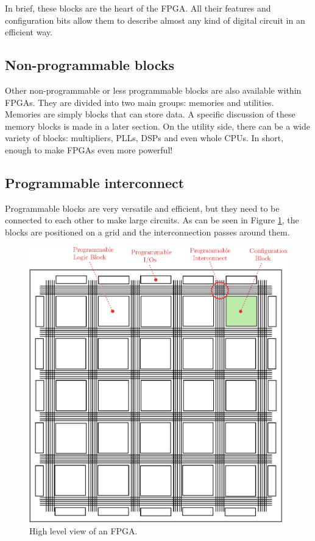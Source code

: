 In brief, these blocks are the heart of the FPGA. All their features and configuration bits allow 
them to describe almost any kind of digital circuit in an efficient way.

\subsection{Non-programmable blocks}

Other non-programmable or less programmable blocks are also available within FPGAs. They are divided 
into two main groups: memories and utilities. Memories are simply blocks that can store data. A 
specific discussion of these memory blocks is made in a later section. On the utility side, 
there can be a wide variety of blocks: multipliers, PLLs, DSPs and even whole CPUs. In short, 
enough to make FPGAs even more powerful!

\subsection{Programmable interconnect}

Programmable blocks are very versatile and efficient, but they need to be connected to each other to 
make large circuits. As can be seen in Figure \ref{fig:fpga/fpga_interconnect}, the blocks are 
positioned on a grid and the interconnection passes around them. 

\begin{figure}[H]
    \centering
    \includegraphics[scale=0.6]{Chapter1-Hardware/res/fpga_interconnect}
    \caption{High level view of an FPGA.}
    \label{fig:fpga/fpga_interconnect}
\end{figure}

